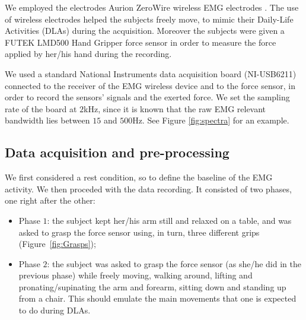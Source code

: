 We employed the electrodes Aurion ZeroWire wireless EMG electrodes
\cite{zerowire}. The use of wireless electrodes helped the subjects
freely move, to mimic their Daily-Life Activities (DLAs) during the
acquisition.
Moreover the subjects were given a FUTEK LMD500 Hand Gripper force
sensor \cite{LMD500} in order to measure the force applied by her/his
hand during the recording.


We used a standard National Instruments data acquisition board
(NI-USB6211) connected to the receiver of the EMG wireless device and
to the force sensor, in order to record the sensors' signals and the
exerted force. We set the sampling rate of the board at $2$kHz, since
it is known that the raw EMG relevant bandwidth lies between $15$ and
$500$Hz. See Figure \ref{fig:spectra} for an example.


\subsection{Data acquisition and pre-processing}
\label{sec:preproc}

We first considered a rest condition, so to define the baseline of the
EMG activity. We then proceded with the data recording.  It consisted
of two phases, one right after the other:

\begin{itemize}

  \item Phase $1$: the subject kept her/his arm still and relaxed on a
    table, and was asked to grasp the force sensor using, in turn,
    three different grips (Figure~\ref{fig:Grasps});

  \item Phase $2$: the subject was asked to grasp the force sensor (as
    she/he did in the previous phase) while freely moving, walking
    around, lifting and pronating/supinating the arm and forearm,
    sitting down and standing up from a chair. This should emulate the
    main movements that one is expected to do during DLAs.

\end{itemize}

